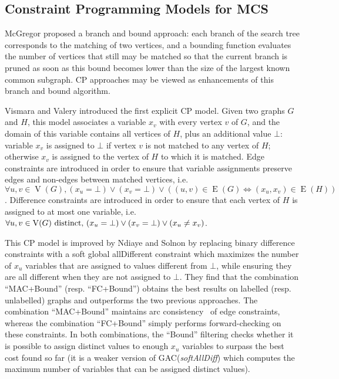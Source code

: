 \documentclass{llncs}
\begin{document}
\subsection{Constraint Programming Models for MCS} \label{CP}

McGregor \cite{McGreg82} proposed a branch and bound approach: each branch of the search tree
corresponds to the matching of two vertices, and a bounding function evaluates the number of
vertices that still may be matched so that the current branch is pruned as soon as this bound
becomes lower than the size of the largest known common subgraph. CP approaches may be viewed as
enhancements of this branch and bound algorithm.

Vismara and Valery  \cite{DBLP:conf/mco/VismaraV08} introduced the first explicit CP model. Given
two graphs $G$ and $H$, this model associates a variable $x_v$ with every vertex $v$ of $G$, and the
domain of this variable contains all vertices of $H$, plus an additional value $\bot$: variable
$x_v$ is assigned to $\bot$ if vertex $v$ is not matched to any vertex of $H$; otherwise $x_v$ is
assigned to the vertex of $H$ to which it is matched. Edge constraints are introduced in order to
ensure that variable assignments preserve edges and non-edges between matched vertices, i.e.\ $\forall u, v \in
\operatorname{V}(G), (x_u = \bot) \vee (x_v = \bot) \vee ((u, v) \in \operatorname{E}(G)
\Leftrightarrow (x_u, x_v) \in \operatorname{E}(H))$.  Difference constraints are introduced in
order to ensure that each vertex of $H$ is assigned to at most one variable, i.e.\ $\forall u, v \in
\operatorname{V}(G)~\textnormal{distinct,}~ (x_u = \bot) \vee (x_v = \bot) \vee (x_u \neq x_v)$.

This CP model is improved by Ndiaye and Solnon \cite{DBLP:conf/cp/NdiayeS11} by replacing binary
difference constraints with a soft global allDifferent constraint which maximizes the number of
$x_u$ variables that are assigned to values different from $\bot$, while ensuring they are all
different when they are not assigned to $\bot$. They find that the combination ``MAC+Bound'' (resp.
``FC+Bound'') obtains the best results on labelled (resp. unlabelled) graphs and outperforms the
two previous approaches. The combination ``MAC+Bound'' maintains arc consistency~\cite{sabi94} of
edge constraints, whereas the combination ``FC+Bound'' simply performs forward-checking on these
constraints. In both combinations, the ``Bound'' filtering checks whether it is possible to assign
distinct values to enough $x_u$ variables to surpass the best cost found so far (it is a weaker
version of GAC(\emph{softAllDiff}) \cite{peti01} which computes the maximum number of variables that
can be assigned distinct values).
\end{document}
